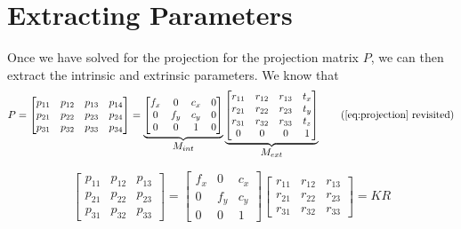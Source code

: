 \section{Extracting Parameters}

Once we have solved for the projection for the projection matrix $P$, we can then extract the intrinsic and extrinsic parameters. We know that
\begin{equation*}
    P =
    \begin{bmatrix}
        p_{11} & p_{12} & p_{13} & p_{14} \\
        p_{21} & p_{22} & p_{23} & p_{24} \\
        p_{31} & p_{32} & p_{33} & p_{34}
    \end{bmatrix}
    =
    \underbrace{
        \begin{bmatrix}
            f_x & 0   & c_x & 0 \\
            0   & f_y & c_y & 0 \\
            0   & 0   & 1   & 0
        \end{bmatrix}
    }_{\mathlarger{M_{int}}}
    \underbrace{
        \begin{bmatrix}
            r_{11} & r_{12} & r_{13} & t_x \\
            r_{21} & r_{22} & r_{23} & t_y \\
            r_{31} & r_{32} & r_{33} & t_z \\
            0      & 0      & 0      & 1
        \end{bmatrix}
    }_{\mathlarger{M_{ext}}} \tag{\ref{eq:projection} revisited}
\end{equation*}

\begin{equation}
    \begin{bmatrix}
        p_{11} & p_{12} & p_{13} \\
        p_{21} & p_{22} & p_{23} \\
        p_{31} & p_{32} & p_{33}
    \end{bmatrix}
    =
    \begin{bmatrix}
        f_x & 0   & c_x \\
        0   & f_y & c_y \\
        0   & 0   & 1
    \end{bmatrix}
    \begin{bmatrix}
        r_{11} & r_{12} & r_{13} \\
        r_{21} & r_{22} & r_{23} \\
        r_{31} & r_{32} & r_{33}
    \end{bmatrix}
    =KR
\end{equation}

